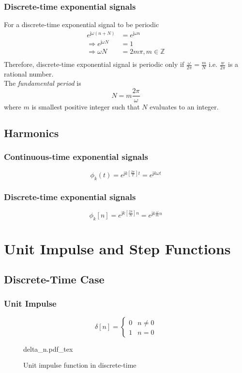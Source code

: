 \documentclass[oneside]{book}
\newcommand{\incfig}[1]{%
    {#1.pdf_tex}
}
\begin{document}
\subsubsection{Discrete-time exponential signals}
For a discrete-time exponential signal to be periodic
\begin{align*}
  e^{\mathsf{j}\omega(n + N)}        & = e^{\mathsf{j}\omega n} \\
  \Rightarrow e^{\mathsf{j}\omega N} & = 1                      \\
  \Rightarrow \omega N               & = 2m\pi, m\in\mathbb{Z}  \\
\end{align*}
Therefore, discrete-time exponential signal is periodic only if \(\displaystyle \frac{\omega}{2\pi} = \frac{m}{N}\) i.e. \(\displaystyle\frac{w}{2\pi}\) is a rational number.\\
The \textit{fundamental period} is
\[
  N = m\frac{2\pi}{\omega}
\]
where $m$ is smallest positive integer such that $N$ evaluates to an integer.

\subsection{Harmonics}
\subsubsection{Continuous-time exponential signals}
\[
  \phi_k(t) = e^{\mathsf{j}k[\frac{2\pi}{T}]t} = e^{\mathsf{j}k\omega t}
\]
\subsubsection{Discrete-time exponential signals}
\[
  \phi_k[n] = e^{\mathsf{j}k[\frac{2\pi}{N}]n} = e^{\mathsf{j}k\frac{\omega}{m} n}
\]

\section{Unit Impulse and Step Functions}
\subsection{Discrete-Time Case}
\subsubsection{Unit Impulse}
\[
  \delta[n] = \begin{cases}
    0 & n\neq 0 \\
    1 & n = 0
  \end{cases}
\]
\begin{figure}[ht]
  \centering
  \incfig{delta_n}
  \caption{Unit impulse function in discrete-time}
\end{figure}
\end{document}
